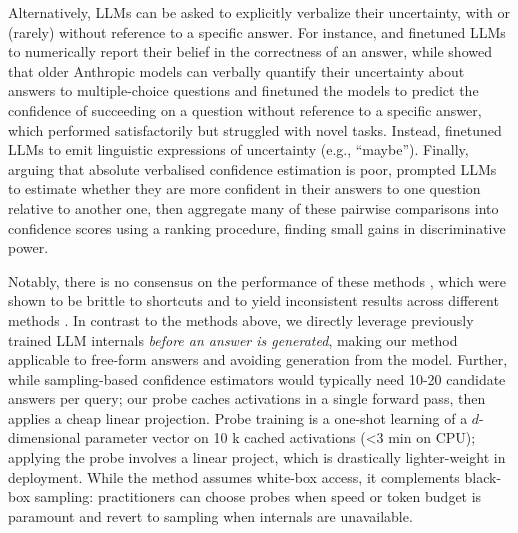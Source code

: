 \documentclass{article} %
\begin{document}
Alternatively, LLMs can be asked to explicitly verbalize their uncertainty, with or (rarely) without reference to a specific answer. For instance, \citep{lin2022teaching} and \cite{kapoor2024large} finetuned LLMs to numerically report their belief in the correctness of an answer, while  \cite{DBLP:journals/corr/abs-2207-05221} showed that older Anthropic models can verbally quantify their uncertainty about answers to multiple-choice questions and finetuned the models to predict the confidence of succeeding on a question without reference to a specific answer, which performed satisfactorily but struggled with novel tasks.
Instead, \cite{chaudhry2024finetuning} finetuned LLMs to emit linguistic expressions of uncertainty (e.g., ``maybe'').
Finally, arguing that absolute verbalised confidence estimation is poor, \cite{shrivastava2025language} prompted LLMs to estimate whether they are more confident in their answers to one question relative to another one, then aggregate many of these pairwise comparisons into confidence scores using a ranking procedure, finding small gains in discriminative power.

Notably, there is no consensus on the performance of 
these methods \citep{kapoor2024large}, which were shown to be brittle to shortcuts \citep{heindrich2025sparse} and to yield inconsistent results across different methods \citep{pawitan2024confidence}. 
In contrast to the methods above, we directly leverage previously trained LLM internals \textit{before an answer is generated}, making our method applicable to free-form answers and avoiding generation from the model. Further, while sampling-based confidence estimators would typically need 10-20 candidate answers per query; our probe caches activations in a single forward pass, then applies a cheap linear projection.  Probe training is a one-shot learning of a \(d\)-dimensional parameter vector  on 10 k cached activations (<3 min on CPU); applying the probe involves a linear project, which is drastically lighter-weight in deployment. While the method assumes white-box access, it complements black-box sampling: practitioners can choose probes when speed or token budget is paramount and revert to sampling when internals are unavailable.
\end{document}
